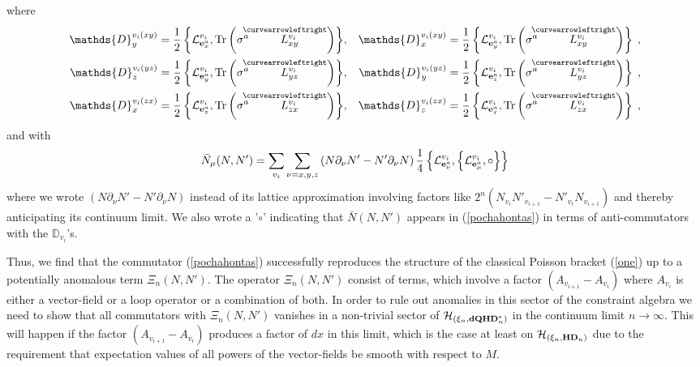 \documentclass[12pt]{article}
\newcommand{\nn}{\nonumber}
\def\m{\mu}
\def\n{\nu}
\def\ch{{\cal H}}
\def\cl{{\cal L}}
\newcommand{\pa}{\partial}
\begin{document}
where
\begin{eqnarray}
\mathds{D}^{v_i(xy) }_{y} = \frac{1}{2}\left\{ \cl^{v_i}_{{\bf e}^a_x}   
 ,  \mbox{Tr} \left( \sigma^a  \stackrel{\hspace{-3mm}\curvearrowleftright}{L^{v_i}_{xy}}        \right)   \right\} &,&
 \mathds{D}^{v_i(xy)}_{x} = \frac{1}{2}\left\{ \cl^{v_i}_{{\bf e}^a_y}   
 ,  \mbox{Tr} \left( \sigma^a  \stackrel{\hspace{-3mm}\curvearrowleftright}{L^{v_i}_{xy}}        \right)   \right\}\;,
 \nn\\
\mathds{D}^{v_i(yz)}_{z} = \frac{1}{2}\left\{     \cl^{v_i}_{{\bf e}^a_y} 
 , \mbox{Tr} \left( \sigma^a  \stackrel{\hspace{-3mm}\curvearrowleftright}{L^{v_i}_{yz}}         \right) \right\}
  &,&
\mathds{D}^{v_i(yz)}_{y}  =\frac{1}{2} \left\{ \cl^{v_i}_{{\bf e}^a_z}  , \mbox{Tr} \left( \sigma^a  \stackrel{\hspace{-3mm}\curvearrowleftright}{L^{v_i}_{yz}}        \right) \right\}\;,
\nn\\
\mathds{D}^{v_i(zx)}_{x} = \frac{1}{2}\left\{     \cl^{v_i}_{{\bf e}^a_z} 
 , \mbox{Tr} \left( \sigma^a  \stackrel{\hspace{-3mm}\curvearrowleftright}{L^{v_i}_{zx}}         \right) \right\}
 &,&
\mathds{D}^{v_i(zx)}_{z}  =\frac{1}{2} \left\{ \cl^{v_i}_{{\bf e}^a_x}  , \mbox{Tr} \left( \sigma^a  \stackrel{\hspace{-3mm}\curvearrowleftright}{L^{v_i}_{zx}}        \right) \right\}\;,
\label{faces}
\end{eqnarray}
and with
$$
\bar{N}_\m(N,N') = \sum_{v_i} \sum_{\n=x,y,z} \left(N\pa_\n N'-N'\pa_\n N\right)\frac{1}{4}\left\{  \cl^{v_i}_{{\bf e}^a_\n} ,  \left\{  \cl^{v_i}_{{\bf e}^a_\m} , \circ  \right\}\right\}
$$
where we wrote $(N\pa_\n N'-N'\pa_\n N)$ instead of its lattice approximation involving factors like $2^n (N_{v_i} N'_{v_{i+1}} - N'_{v_i} N_{v_{i+1}} )$ and thereby anticipating its continuum limit. We also wrote a '$\circ$' indicating that $\bar{N}(N,N') $ appears in (\ref{pochahontas}) in terms of anti-commutators with the $\mathds{D}_{v_i}$'s.


Thus, we find that the commutator (\ref{pochahontas}) successfully reproduces the structure of the classical Poisson bracket (\ref{one}) up to a potentially anomalous term $\Xi_n(N,N')$. The operator $\Xi_n(N,N')$ consist of terms, which involve a factor $(A_{v_{i+1}}-A_{v_i})$ where $A_{v_i}$ is either a vector-field or a loop operator or a combination of both. In order to rule out anomalies in this sector of the constraint algebra we need to show that all commutators with $\Xi_n(N,N')$ vanishes in a non-trivial sector of $\ch_{(\xi_n,\mathbf{dQHD}^*_n)}$ in the continuum limit $n\rightarrow\infty$. This will happen
if the factor $(A_{v_{i+1}}-A_{v_i})$ produces a factor of $dx$ in this limit, which is the case at least on $\ch_{(\xi_n,\mathbf{HD}_n)}$ due to the requirement that expectation values of all powers of the vector-fields be smooth with respect to $M$.
\end{document}
